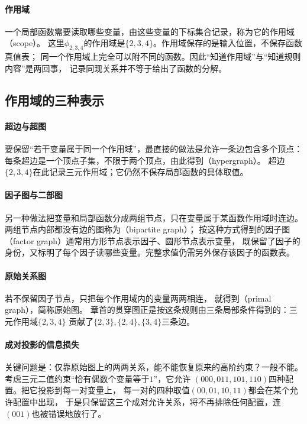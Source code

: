 \paragraph{作用域}
一个局部函数需要读取哪些变量，由这些变量的下标集合记录，称为它的作用域（scope）。
这里$\phi_{2,3,4}$的作用域是$\{2,3,4\}$。作用域保存的是输入位置，不保存函数真值表；
同一个作用域上完全可以附不同的函数。因此“知道作用域”与“知道规则内容”是两回事，
记录同现关系并不等于给出了函数的分解。

\subsection{作用域的三种表示}

\paragraph{超边与超图}
要保留“若干变量属于同一个作用域”，最直接的做法是允许一条边包含多个顶点：
每条超边是一个顶点子集，不限于两个顶点，由此得到（hypergraph）。
超边$\{2,3,4\}$在此记录三元作用域；它仍然不保存局部函数的具体取值。

\paragraph{因子图与二部图}
另一种做法把变量和局部函数分成两组节点，只在变量属于某函数作用域时连边。
两组节点内部都没有边的图称为（bipartite graph）；
按这种方式得到的因子图（factor graph）通常用方形节点表示因子、圆形节点表示变量，
既保留了因子的身份，又标明了每个因子读哪些变量。完整求值仍需另外保存该因子的函数表。

\paragraph{原始关系图}
若不保留因子节点，只把每个作用域内的变量两两相连，
就得到（primal graph），简称原始图。
章首的贯穿图正是按这条规则由三条局部条件得到的：三元作用域$\{2,3,4\}$
贡献了$\{2,3\},\{2,4\},\{3,4\}$三条边。

\paragraph{成对投影的信息损失}
关键问题是：仅靠原始图上的两两关系，能不能恢复原来的高阶约束？一般不能。
考虑三元二值约束“恰有偶数个变量等于$1$”，它允许
$(000,011,101,110)$四种配置。把它投影到每一对变量上，
每一对的四种取值$(00,01,10,11)$都会在某个允许配置中出现，
于是只保留这三个成对允许关系，将不再排除任何配置，连$(001)$也被错误地放行了。

